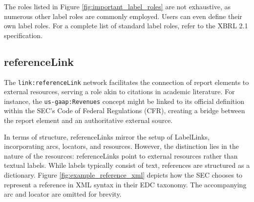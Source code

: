 The roles listed in Figure \ref{fig:important_label_roles} are not exhaustive, as numerous other label roles are commonly employed.
Users can even define their own label roles.
For a complete list of standard label roles, refer to the XBRL 2.1 specification\cite{xbrl21_label_roles}.

\subsection{referenceLink}




The \texttt{link:referenceLink} network facilitates the connection of report elements to external resources, serving a role akin to citations in academic literature.  
For instance, the \texttt{us-gaap:Revenues} concept might be linked to its official definition within the SEC's Code of Federal Regulations (CFR),  
creating a bridge between the report element and an authoritative external source.  

In terms of structure, referenceLinks mirror the setup of LabelLinks, incorporating arcs, locators, and resources.  
However, the distinction lies in the nature of the resources: referenceLinks point to external resources rather than textual labels.  
While labels typically consist of text, references are structured as a dictionary.  
Figure \ref{fig:example_reference_xml} depicts how the SEC chooses to represent a reference in XML syntax in their EDC taxonomy\cite{sec_edc}.
The accompanying arc and locator are omitted for brevity.

